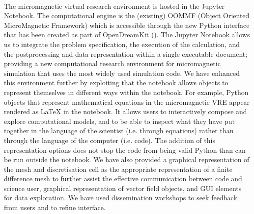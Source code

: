 \documentclass{deliverablereport}
\begin{document}


\paragraph{} %

The micromagnetic virtual research environment is hosted in the Jupyter
Notebook. The computational engine is the (existing) OOMMF (Object Oriented
MicroMagnetic Framework) which is accessible through the new Python interface
that has been created as part of OpenDreamKit  
(). The Jupyter Notebook allows us to
integrate the problem specification, the execution of the calculation, and the
postprocessing and data representation within a single executable document;
providing a new computational research environment for micromagnetic
simulation that uses the most widely used simulation code. We have enhanced
this environment further by exploiting that the notebook allows objects to
represent themselves in different ways within the notebook. For example,
Python objects that represent mathematical equations in the micromagnetic VRE
appear rendered as \LaTeX{} in the notebook. It allows users to interactively
compose and explore computational models, and to be able to inspect what they
have put together in the language of the scientist (i.e. through equations)
rather than through the language of the computer (i.e. code). The addition of
this representation options does not stop the code from being valid Python
than can be run outside the notebook. We have also provided a graphical
representation of the mesh and discretisation cell as the appropriate
representation of a finite difference mesh to further assist the effective
communication between code and science user, graphical representation of
vector field objects, and GUI elements for data exploration. We have used dissemination workshops 
to seek feedback from users and to refine interface.

\paragraph{}
\end{document}
